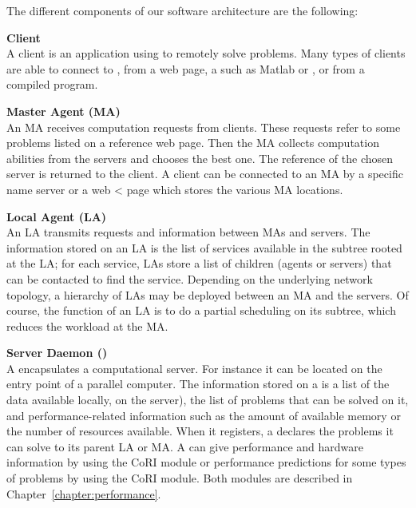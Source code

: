 The different components of our software architecture are the
following:

\begin{description}
\item \textbf{Client}\\ A client is an application using \diet to remotely solve
  problems. Many types of clients are able to connect to \diet, from a
  web page, a \pse such as Matlab or \sci, or from a compiled program.
\item \textbf{Master Agent (MA)}\\ An MA receives computation requests from
  clients. These requests refer to some \diet problems listed on a reference
  web page. Then the MA collects computation abilities from the servers and
  chooses the best one. The reference of the chosen server is returned to the
  client. A client can be connected to an MA by a specific name server or a web
<  page which stores the various MA locations.

\item \textbf{Local Agent (LA)}\\ An LA transmits requests and information
  between MAs and servers.  The information stored on an LA is the list of
  services available in the subtree rooted at the LA; for each service, LAs
  store a list of children (agents or servers) that can be contacted to find
  the service. Depending on the underlying network topology, a hierarchy of LAs
  may be deployed between an MA and the servers. Of course, the function of an
  LA is to do a partial scheduling on its subtree, which reduces the workload
  at the MA.

\item \textbf{Server Daemon (\sed)}\\ A \sed encapsulates a computational
  server. For instance it can be located on the entry point of a parallel
  computer. The information stored on a \sed is a list of the data available
  locally, \ie on the server), the list of problems that can be solved on it,
  and performance-related information such as the amount of available memory or
  the number of resources available. When it registers, a \sed declares the
  problems it can solve to its parent LA or MA.  A \sed can give performance and
  hardware information by using the CoRI module or performance predictions for
  some types of problems by using the CoRI module.  Both modules are described
  in Chapter~\ref{chapter:performance}.

\end{description}

